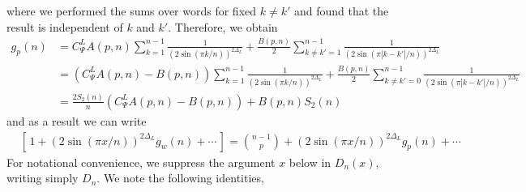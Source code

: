 \documentclass[11pt]{article}
\newcommand{\nn}{\nonumber}
\begin{document}
  where we performed the sums over words for fixed $k\neq k'$ and found that the
  result is independent of $k$ and $k'$. Therefore, we obtain
  \begin{align}
    g_{p}(n) & =C_{\Psi}^LA(p,n)\sum_{k=1}^{n-1}\frac{1}{(2\sin(\pi k/n))^{2\Delta_L}}+\frac{B(p,n)}{2}\sum_{k\neq k'=1}^{n-1}\frac{1}{(2\sin(\pi |k-k'|/n))^{2\Delta_L}}\nn      \\
             & =(C_{\Psi}^LA(p,n)-B(p,n))\sum_{k=1}^{n-1}\frac{1}{(2\sin(\pi k/n))^{2\Delta_L}}+\frac{B(p,n)}{2}\sum_{k\neq k'=0}^{n-1}\frac{1}{(2\sin(\pi |k-k'|/n))^{2\Delta_L}}\nn \\
             & =\frac{2S_{2}(n)}{n}(C_{\Psi}^LA(p,n)-B(p,n))+B(p,n)S_{2}(n)                                                                                         %
  \end{align}
  and as a result we can write
  \begin{align}
     & \left[\,1+(2\sin(\pi x/n))^{2\Delta_L}g_{w}(n)+\cdots\,\right]=\binom{n-1}{p}+(2\sin(\pi x/n))^{2\Delta_L}g_{p}(n)+\cdots\,
  \end{align}
For notational convenience, we suppress the argument $x$ below in $D_n(x)$, writing simply $D_n$.
We note the following identities,
\end{document}
